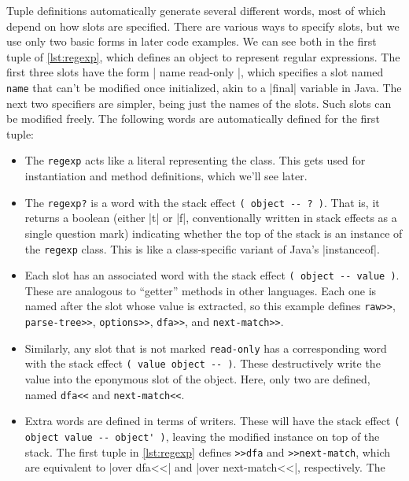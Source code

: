 Tuple definitions automatically generate several different words, most of which
depend on how slots are specified.  There are various ways to specify slots,
but we use only two basic forms in later code examples.  We can see both in the
first tuple of \vref{lst:regexp}, which defines an object to represent regular
expressions.  The first three slots have the form
%
\factor|{ name read-only }|,
%
which specifies a slot named \Verb|name| that can't be modified once
initialized, akin to a |final| variable in Java.  The next two
specifiers are simpler, being just the names of the slots.  Such slots can be
modified freely.  The following words are automatically defined for the first
tuple:
\begin{itemize}
  \item The \Verb|regexp|  acts like a literal representing
  the class.  This gets used for instantiation and method definitions, which
  we'll see later.
%
  \item The \Verb|regexp?|  is a word with the stack
  effect \Verb|( object -- ? )|.  That is, it returns a boolean (either
  \factor|t| or \factor|f|, conventionally written in stack effects as a single
  question mark) indicating whether the top of the stack is an instance of the
  \Verb|regexp| class.  This is like a class-specific variant of Java's
  |instanceof|.
%
  \item Each slot has an associated  word with the stack effect %
  \Verb|( object -- value )|.  These are analogous  to ``getter'' methods in
  other languages.  Each one is named after the slot whose value is extracted,
  so this example defines \Verb|raw>>|, \Verb|parse-tree>>|, \Verb|options>>|,
  \Verb|dfa>>|, and \Verb|next-match>>|.
%
  \item Similarly, any slot that is not marked \Verb|read-only| has a
  corresponding  word with the stack effect                      %
  \Verb|( value object -- )|.  These destructively write the value into the
  eponymous slot of the object.  Here, only two are defined, named \Verb|dfa<<|
  and \Verb|next-match<<|.
%
  \item Extra  words are defined in terms of writers.  These will
  have the stack effect \Verb|( object value -- object' )|, leaving the
  modified instance on top of the stack.  The first tuple in \vref{lst:regexp}
  defines \Verb|>>dfa| and \Verb|>>next-match|, which are equivalent to
  \factor|over dfa<<| and \factor|over next-match<<|, respectively.  The

\end{itemize}
